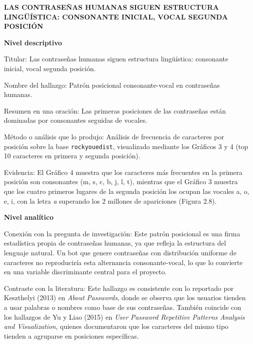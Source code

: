 \documentclass[12pt, letterpaper]{article}
\begin{document}
\begin{center}
    \vspace{0.8cm}
    {\Large \bfseries LAS CONTRASEÑAS HUMANAS SIGUEN ESTRUCTURA LINGÜÍSTICA: CONSONANTE INICIAL, VOCAL SEGUNDA POSICIÓN} \\
    \vspace{0.4cm}
\end{center}

\vspace{1.5cm}

\noindent
\textbf{Nivel descriptivo} \newline

\noindent
Titular: Las contraseñas humanas siguen estructura lingüística: consonante inicial, vocal segunda posición. \newline

\noindent
Nombre del hallazgo: Patrón posicional consonante-vocal en contraseñas humanas. \newline

\noindent
Resumen en una oración: Las primeras posiciones de las contraseñas están dominadas por consonantes seguidas de vocales. \newline

\noindent
Método o análisis que lo produjo: Análisis de frecuencia de caracteres por posición sobre la base \texttt{rockyouedist}, visualizado mediante los Gráficos 3 y 4 (top 10 caracteres en primera y segunda posición). \newline

\noindent
Evidencia: El Gráfico 4 muestra que los caracteres más frecuentes en la primera posición son consonantes (m, s, c, b, j, l, t), mientras que el Gráfico 3 muestra que los cuatro primeros lugares de la segunda posición los ocupan las vocales a, o, e, i, con la letra \textit{a} superando los 2 millones de apariciones (Figura 2.8).
\newpage

\noindent
\textbf{Nivel analítico} \newline

\noindent
Conexión con la pregunta de investigación: Este patrón posicional es una firma estadística propia de contraseñas humanas, ya que refleja la estructura del lenguaje natural. Un bot que genere contraseñas con distribución uniforme de caracteres no reproduciría esta alternancia consonante-vocal, lo que lo convierte en una variable discriminante central para el proyecto. \newline

\noindent
Contraste con la literatura: Este hallazgo es consistente con lo reportado por Keszthelyi (2013) en \textit{About Passwords}, donde se observa que los usuarios tienden a usar palabras o nombres como base de sus contraseñas. También coincide con los hallazgos de Yu y Liao (2015) en \textit{User Password Repetitive Patterns Analysis and Visualization}, quienes documentaron que los caracteres del mismo tipo tienden a agruparse en posiciones específicas. \newline
\end{document}
